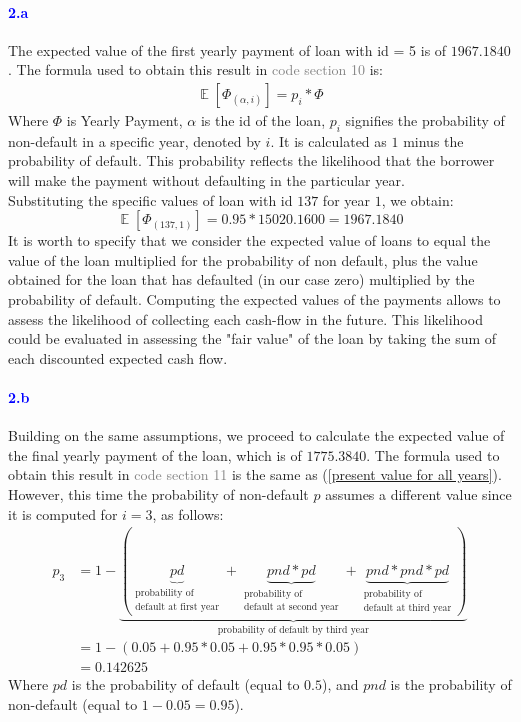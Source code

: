 \documentclass[a4paper,12pt]{article}
\begin{document}
\paragraph{\textcolor{Blue}{2.a}} The expected value of the first yearly payment of loan with id = 5 is of $1967.1840$. The formula used to obtain this result in \textcolor{gray}{code section 10} is:
\begin{align}\label{expected value for one year}
    \mathop{\mathbb{E}}[\Phi_{(\alpha, i)}] = p_{i} * \Phi
\end{align}
Where $\Phi$ is Yearly Payment, $\alpha$ is the id of the loan, $p_i$ signifies the probability of non-default in a specific year, denoted by $i$. It is calculated as $1$ minus the probability of default. This probability reflects the likelihood that the borrower will make the payment without defaulting in the particular year.\\
Substituting the specific values of loan with id $137$ for year $1$, we obtain:
$$\mathop{\mathbb{E}}[\Phi_{(137, 1)}] = 0.95 * 15020.1600 = 1967.1840$$
It is worth to specify that we consider the expected value of loans to equal the value of the loan multiplied for the probability of non default, plus the value obtained for the loan that has defaulted (in our case zero) multiplied by the probability of default. Computing the expected values of the payments allows to assess the likelihood of collecting each cash-flow in the future. This likelihood could be evaluated in assessing the "fair value" of the loan by taking the sum of each discounted expected cash flow.

\paragraph{\textcolor{Blue}{2.b}} Building on the same assumptions, we proceed to calculate the expected value of the final yearly payment of the loan, which is of $1775.3840$. The formula used to obtain this result in \textcolor{gray}{code section 11} is the same as (\ref{present value for all years}). However, this time the probability of non-default $p$ assumes a different value since it is computed for $i = 3$, as follows:
\begin{align*}
    p_{3} &= 1 - \underbrace{( \underbrace{pd}_{
\substack{\text{probability of} \\
  \text{default at first year}}
}
+ \underbrace{pnd * pd}_{
    \substack{\text{probability of} \\
      \text{default at second year}}
    }
    + \underbrace{pnd * pnd * pd}_{
        \substack{\text{probability of} \\
          \text{default at third year}}
        })}_{\text{probability of default by third year}}\\
        &= 1 - (0.05 + 0.95 * 0.05 + 0.95 * 0.95 * 0.05)\\
        &= 0.142625
\end{align*}
Where $pd$ is the probability of default (equal to $0.5$), and $pnd$ is the probability of non-default (equal to $1 - 0.05 = 0.95$).\\
\end{document}
